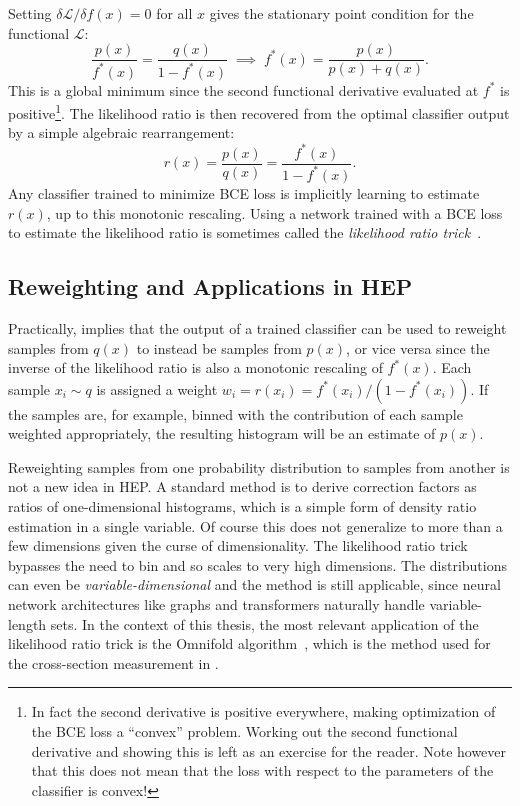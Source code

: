 Setting $\delta\mathcal{L}/\delta f(x) = 0$ for all $x$ gives the stationary point condition for the functional $\mathcal{L}$:
\begin{equation}
    \frac{p(x)}{f^*(x)} = \frac{q(x)}{1-f^*(x)}
    \;\implies\;
    f^*(x) = \frac{p(x)}{p(x) + q(x)}.
    \label{eqn:optimal_classifier}
\end{equation}
This is a global minimum since the second functional derivative evaluated at $f^*$ is positive\footnote{In fact the second derivative is positive everywhere, making optimization of the BCE loss a ``convex'' problem. Working out the second functional derivative and showing this is left as an exercise for the reader. Note however that this does not mean that the loss with respect to the parameters of the classifier is convex!}.
The likelihood ratio is then recovered from the optimal classifier output by a simple algebraic rearrangement:
\begin{equation}
    r(x) = \frac{p(x)}{q(x)} = \frac{f^*(x)}{1 - f^*(x)}.
    \label{eqn:ratio_from_classifier}
\end{equation}
Any classifier trained to minimize BCE loss is implicitly learning to estimate $r(x)$, up to this monotonic rescaling.
Using a network trained with a BCE loss to estimate the likelihood ratio is sometimes called the \textit{likelihood ratio trick}~\cite{Cranmer:2015bka,Andreassen:2019nnm}.

\subsection{Reweighting and Applications in HEP}
\label{sec:dre_hep}

Practically,  implies that the output of a trained classifier can be used to reweight samples from $q(x)$ to instead be samples from $p(x)$, or vice versa since the inverse of the likelihood ratio is also a monotonic rescaling of $f^*(x)$.
Each sample $x_i \sim q$ is assigned a weight $w_i = r(x_i) = f^*(x_i) / (1 - f^*(x_i))$.
If the samples are, for example, binned with the contribution of each sample weighted appropriately, the resulting histogram will be an estimate of $p(x)$.

Reweighting samples from one probability distribution to samples from another is not a new idea in HEP.
A standard method is to derive correction factors as ratios of one-dimensional histograms, which is a simple form of density ratio estimation in a single variable.
Of course this does not generalize to more than a few dimensions given the curse of dimensionality.
The likelihood ratio trick bypasses the need to bin and so scales to very high dimensions.
The distributions can even be \textit{variable-dimensional} and the method is still applicable, since neural network architectures like graphs and transformers naturally handle variable-length sets.
In the context of this thesis, the most relevant application of the likelihood ratio trick is the Omnifold algorithm~\cite{Andreassen:2019cjw}, which is the method used for the cross-section measurement in .
